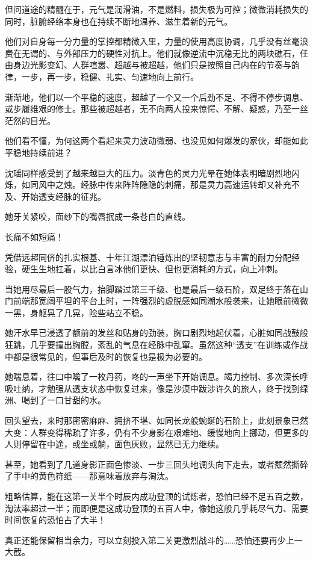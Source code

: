 但问道途的精髓在于，元气是润滑油，不是燃料，损失极为可控；微微消耗损失的同时，脏腑经络本身也在持续不断地温养、滋生着新的元气。

他们对自身每一分力量的掌控都精微入里，力量的使用高度协调，几乎没有丝毫浪费在无谓的、与外部压力的硬性对抗上。他们就像逆流中沉稳无比的两块礁石，任由身边光影变幻、人群喧嚣、超越与被超越，他们只是按照自己内在的节奏与韵律，一步，再一步，稳健、扎实、匀速地向上前行。

渐渐地，他们以一个平稳的速度，超越了一个又一个后劲不足、不得不停步调息、或步履维艰的修士。那些被超越者，无不向两人投来惊愕、不解、疑惑，乃至一丝茫然的目光。

他们看不懂，为何这两个看起来灵力波动微弱、也没见如何爆发的家伙，却能如此平稳地持续前进？

沈瑶同样感受到了越来越巨大的压力。淡青色的灵力光晕在她体表明暗剧烈地闪烁，如同风中之烛。经脉中传来阵阵隐隐的刺痛，那是灵力高速运转却又补充不及、开始透支经脉的征兆。

她牙关紧咬，面纱下的嘴唇抿成一条苍白的直线。

长痛不如短痛！

凭借远超同侪的扎实根基、十年江湖漂泊锤炼出的坚韧意志与丰富的耐力分配经验，硬生生地扛着，以比白言冰他们更快、但也更消耗的方式，向上冲刺。

当她用尽最后一股气力，抬脚踏过第三千级、也是最后一级石阶，双足终于落在山门前端那宽阔平坦的平台上时，一阵强烈的虚脱感如同潮水般袭来，让她眼前微微一黑，身躯晃了几晃，险些站立不稳。

她汗水早已浸透了额前的发丝和贴身的劲装，胸口剧烈地起伏着，心脏如同战鼓般狂跳，几乎要撞出胸膛，紊乱的气息在经脉中乱窜。虽然这种“透支”在训练或作战中都是很常见的，但事后及时的恢复也是极为必要的。

她喘息着，往口中噙了一枚丹药，咚的一声坐下开始调息。竭力控制、多次深长呼吸吐纳，才勉强从透支状态中恢复过来，像是沙漠中跋涉许久的旅人，终于找到绿洲、喝到了一口甘甜的水。

回头望去，来时那密密麻麻、拥挤不堪、如同长龙般蜿蜒的石阶上，此刻景象已然大变：人群变得稀疏了许多，仍有不少身影在艰难地、缓慢地向上挪动，但更多的人则停留在中途，或坐或躺，面色灰败，显然已无力继续。

甚至，她看到了几道身影正面色惨淡、一步三回头地调头向下走去，或者颓然撕碎了手中的黄色符纸——那意味着放弃与淘汰。

粗略估算，能在这第一关半个时辰内成功登顶的试炼者，恐怕已经不足五百之数，淘汰率超过一半；而即便是这成功登顶的五百人中，像她这般几乎耗尽气力、需要时间恢复的恐怕占了大半！

真正还能保留相当余力，可以立刻投入第二关更激烈战斗的……恐怕还要再少上一大截。

